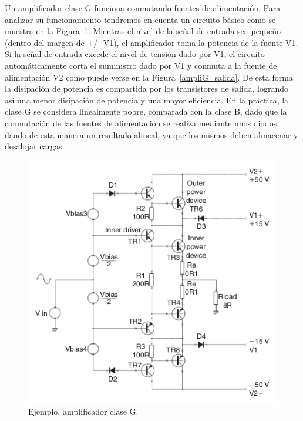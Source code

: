 \documentclass[a4paper,12pt,twoside]{article}
\begin{document}
Un amplificador clase G funciona conmutando fuentes de alimentación. Para analizar su funcionamiento tendremos en cuenta un circuito básico como se muestra en la Figura~\ref{ampliG}. Mientras el nivel de la señal de entrada sea pequeño (dentro del margen de +/- V1), el amplificador toma la potencia de la fuente V1. Si la señal de entrada excede el nivel de tensión dado por V1, el circuito automáticamente corta el suministro dado por V1 y conmuta a la fuente de alimentación V2 como puede verse en la Figura~\ref{ampliG_salida}. De esta forma la disipación de potencia es compartida por los transistores de salida, logrando así una menor disipación de potencia y una mayor eficiencia.
En la práctica, la clase G se considera linealmente pobre, comparada con la clase B, dado que la conmutación de las fuentes de alimentación se realiza mediante unos diodos, dando de esta manera un resultado alineal, ya que los mismos deben almacenar y desalojar cargas.
 
\begin{figure}[H]
 \centering
 \includegraphics[scale=0.55]{img/ampliG.png}
 \caption{Ejemplo, amplificador clase G.}
 \label{ampliG} 
 \end{figure}
  
\end{document}
